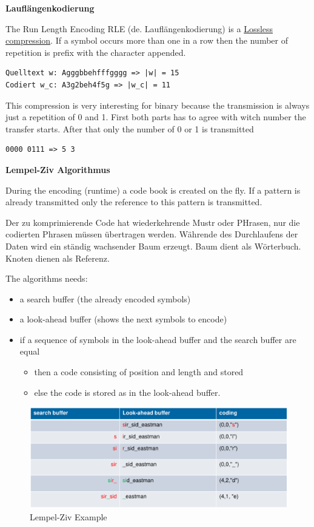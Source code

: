 \documentclass[11pt,twoside,twocolumn,landscape]{article}
\begin{document}
\textbf{Lauflängenkodierung}

The Run Length Encoding RLE (de. Lauflängenkodierung) is a \href{../../../roam/20211014093202-lossless_compression.org}{Lossless compression}.
If a symbol occurs more than one in a row then the number of repetition is prefix with the character appended. 

\begin{verbatim}
Quelltext w: Agggbbehfffgggg => |w| = 15
Codiert w_c: A3g2beh4f5g => |w_c| = 11
\end{verbatim}

This compression is very interesting for binary because the transmission is always just a repetition of 0 and 1.
First both parts has to agree with witch number the transfer starts.
After that only the number of 0 or 1 is transmitted

\begin{verbatim}
0000 0111 => 5 3
\end{verbatim}

\textbf{Lempel-Ziv Algorithmus}

During the encoding (runtime) a code book is created on the fly.
If a pattern is already transmitted only the reference to this pattern is transmitted.


Der zu komprimierende Code hat wiederkehrende Mustr oder PHrasen, nur die codierten Phrasen müssen übertragen werden.
Währende des Durchlaufens der Daten wird ein ständig wachsender Baum erzeugt.
Baum dient als Wörterbuch.
Knoten dienen als Referenz.


The algorithms needs:
\begin{itemize}
\item a search buffer (the already encoded symbols)
\item a look-ahead buffer (shows the next symbols to encode)
\item if a sequence of symbols in the look-ahead buffer and the search buffer are equal
\begin{itemize}
\item then a code consisting of position and length and stored
\item else the code is stored as in the look-ahead buffer.
\end{itemize}
\end{itemize}


\begin{figure}[htbp]
\centering
\includegraphics[width=.9\linewidth]{img/lempel_ziv_example.png}
\caption{\label{fig:org4da3f43}Lempel-Ziv Example}
\end{figure}
\end{document}
